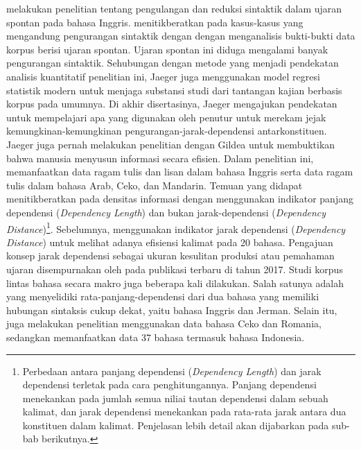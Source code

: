 \cite{jaeger2006redundancy} melakukan penelitian tentang pengulangan dan reduksi sintaktik dalam ujaran spontan pada bahasa Inggris. \cite{jaeger2006redundancy}  menitikberatkan pada kasus-kasus yang mengandung pengurangan sintaktik dengan dengan menganalisis bukti-bukti data korpus berisi ujaran spontan. Ujaran spontan ini diduga mengalami banyak pengurangan sintaktik. Sehubungan dengan metode yang menjadi pendekatan analisis kuantitatif penelitian ini, Jaeger juga menggunakan model regresi statistik modern untuk menjaga substansi studi dari tantangan kajian berbasis korpus pada umumnya. Di akhir disertasinya, Jaeger mengajukan pendekatan untuk mempelajari apa yang digunakan oleh penutur untuk merekam jejak kemungkinan-kemungkinan \gls{pengurangan-jarak-dependensi} antarkonstituen. Jaeger juga pernah melakukan penelitian dengan Gildea \citep{gildea2015human} untuk membuktikan bahwa manusia menyusun informasi secara efisien. Dalam penelitian ini, \cite{gildea2015human} memanfaatkan data ragam tulis dan lisan dalam bahasa Inggris serta data ragam tulis dalam bahasa Arab, Ceko, dan Mandarin. Temuan yang didapat menitikberatkan pada densitas informasi dengan menggunakan indikator panjang dependensi (\textit{Dependency Length}) dan bukan \gls{jarak-dependensi} (\textit{Dependency Distance})\footnote{Perbedaan antara panjang dependensi (\textit{Dependency Length}) dan jarak dependensi terletak pada cara penghitungannya. Panjang dependensi menekankan pada jumlah semua niliai tautan dependensi dalam sebuah kalimat, dan jarak dependensi menekankan pada rata-rata jarak antara dua konstituen dalam kalimat. Penjelasan lebih detail akan dijabarkan pada sub-bab berikutnya.}. Sebelumnya, \cite{liu2008dependency} menggunakan indikator jarak dependensi (\textit{Dependency Distance}) untuk melihat adanya efisiensi kalimat pada 20 bahasa. Pengajuan konsep jarak dependensi sebagai ukuran kesulitan produksi atau pemahaman ujaran disempurnakan oleh \cite{liu2017dependency} pada publikasi terbaru di tahun 2017. Studi korpus lintas bahasa secara makro juga beberapa kali dilakukan. Salah satunya adalah \cite{gildea2010grammars} yang menyelidiki \gls{rata-panjang-dependensi} dari dua bahasa yang memiliki hubungan sintaksis cukup dekat, yaitu bahasa Inggris dan Jerman. Selain itu, \cite{i2004euclidean} juga melakukan penelitian menggunakan data bahasa Ceko dan Romania, sedangkan \cite{futrell2015large} memanfaatkan data 37 bahasa termasuk bahasa Indonesia.

